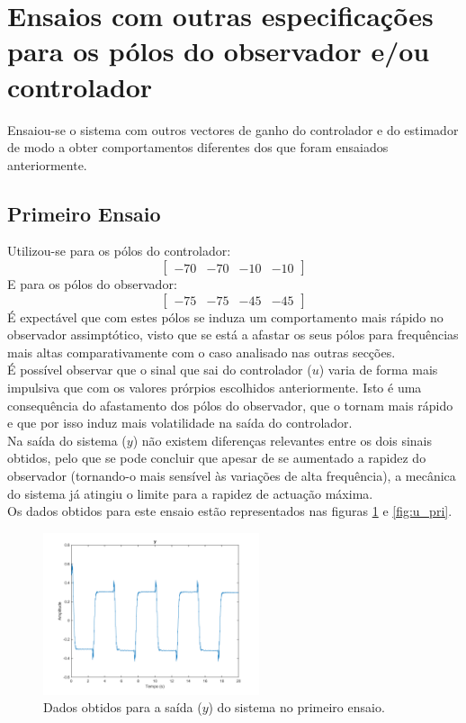 \documentclass[%
  reprint,
  nofootinbib,
  amsmath,amssymb,
  aps,
  10pt,
  a4paper
]{revtex4-1}
\begin{document}
\section{Ensaios com outras especificações para os pólos do observador e/ou controlador}
Ensaiou-se o sistema com outros vectores de ganho do controlador e do estimador de modo a obter comportamentos diferentes dos que foram ensaiados anteriormente.\\
\subsection{Primeiro Ensaio}
Utilizou-se para os pólos do controlador:
\begin{equation}
\begin{bmatrix}
-70 & -70  & -10 &-10
\end{bmatrix}
\end{equation}
E para os pólos do observador:
\begin{equation}
\begin{bmatrix}
-75 & -75  & -45 &-45
\end{bmatrix}
\end{equation}
É expectável que com estes pólos se induza um comportamento mais rápido no observador assimptótico, visto que se está a afastar os seus pólos para frequências mais altas comparativamente com o caso analisado nas outras secções.\\
É possível observar que o sinal que sai do controlador ($u$) varia de forma mais impulsiva que com os valores prórpios escolhidos anteriormente. Isto é uma consequência do afastamento dos pólos do observador, que o tornam mais rápido e que por isso induz mais volatilidade na saída do controlador.\\
Na saída do sistema ($y$) não existem diferenças relevantes entre os dois sinais obtidos, pelo que se pode concluir que apesar de se aumentado a rapidez do observador (tornando-o mais sensível às variações de alta frequência), a mecânica do sistema já atingiu o limite para a rapidez de actuação máxima.\\
Os dados obtidos para este ensaio estão representados nas figuras \ref{fig:y_pri} e \ref{fig:u_pri}.
\begin{figure}
\includegraphics[width=2.5in]{../imgs/dados_00_a/dados_00_a_y.png}
\caption{Dados obtidos para a saída ($y$) do sistema no primeiro ensaio.}
\label{fig:y_pri}
\end{figure}
\end{document}
